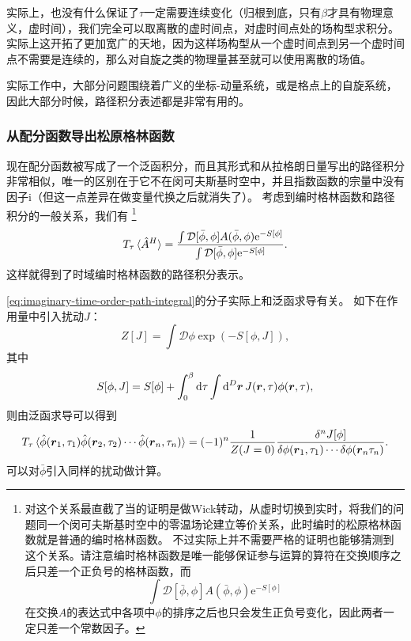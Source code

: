 \documentclass[hyperref, UTF8, a4paper]{ctexart}
\newcommand*{\ii}{\mathrm{i}}
\newcommand*{\ee}{\mathrm{e}}
\newcommand*{\fd}[1]{\mathcal{D}{#1}}
\begin{document}
实际上，也没有什么保证了$\tau$一定需要连续变化（归根到底，只有$\beta$才具有物理意义，虚时间），我们完全可以取离散的虚时间点，对虚时间点处的场构型求积分。
实际上这开拓了更加宽广的天地，因为这样场构型从一个虚时间点到另一个虚时间点不需要是连续的，那么对自旋之类的物理量甚至就可以使用离散的场值。


实际工作中，大部分问题围绕着广义的坐标-动量系统，或是格点上的自旋系统，因此大部分时候，路径积分表述都是非常有用的。

\subsubsection{从配分函数导出松原格林函数}

现在配分函数被写成了一个泛函积分，而且其形式和从拉格朗日量写出的路径积分非常相似，唯一的区别在于它不在闵可夫斯基时空中，并且指数函数的宗量中没有因子$\ii$（但这一点差异在做变量代换之后就消失了）。
考虑到编时格林函数和路径积分的一般关系，我们有%
\footnote{对这个关系最直截了当的证明是做Wick转动，从虚时切换到实时，将我们的问题同一个闵可夫斯基时空中的零温场论建立等价关系，此时编时的松原格林函数就是普通的编时格林函数。
不过实际上并不需要严格的证明也能够猜测到这个关系。请注意编时格林函数是唯一能够保证参与运算的算符在交换顺序之后只差一个正负号的格林函数，而
\[
    \int \fd{[\bar{\phi}, \phi]} A(\bar{\phi}, \phi) \ee^{- S[\phi]}
\]
在交换$A$的表达式中各项中$\phi$的排序之后也只会发生正负号变化，因此两者一定只差一个常数因子。
}%
\begin{equation}
    T_\tau \expval*{\hat{A}^H} = \frac{\int \fd{[\bar{\phi}, \phi]} A(\bar{\phi}, \phi) \ee^{- S[\phi]}}{\int \fd{[\bar{\phi}, \phi]} \ee^{- S[\phi]}}.
    \label{eq:imaginary-time-order-path-integral}
\end{equation}
这样就得到了时域编时格林函数的路径积分表示。

\eqref{eq:imaginary-time-order-path-integral}的分子实际上和泛函求导有关。
如下在作用量中引入扰动$J$：
\begin{equation}
    Z[J] = \int \fd{\phi} \exp ( - S[\phi, J] ),
\end{equation}
其中
\begin{equation}
    S[\phi, J] = S[\phi] + \int_0^\beta \dd{\tau} \int \dd[D]{\vb*{r}} J(\vb*{r}, \tau) \phi(\vb*{r}, \tau),
\end{equation}
则由泛函求导可以得到
\begin{equation}
    T_\tau \expval*{\hat{\phi}(\vb*{r}_1, \tau_1) \hat{\phi}(\vb*{r}_2, \tau_2) \cdots \hat{\phi}(\vb*{r}_n, \tau_n)} = (-1)^n \frac{1}{Z(J=0)} \frac{\var^n J[\phi]}{\var{\phi(\vb*{r}_1, \tau_1)} \cdots \var{\phi(\vb*{r}_n \tau_n)}}.
\end{equation}
可以对$\bar{\phi}$引入同样的扰动做计算。
\end{document}
